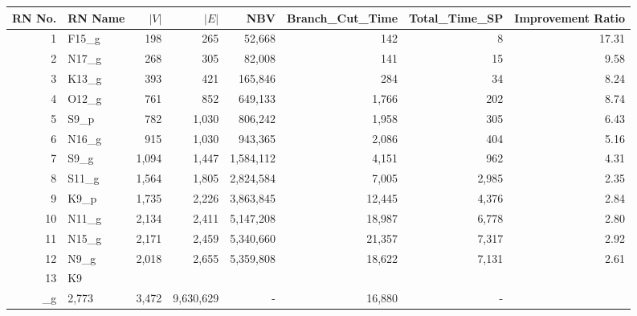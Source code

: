 \begin{tabular}{rlrrrrrr}
\toprule
RN No. & RN Name & $|V|$ & $|E|$ & NBV & Branch_Cut_Time & Total_Time_SP & Improvement Ratio \\
\midrule
1 & F15\_g & 198 & 265 & 52,668 & 142 & 8 & 17.31 \\
2 & N17\_g & 268 & 305 & 82,008 & 141 & 15 & 9.58 \\
3 & K13\_g & 393 & 421 & 165,846 & 284 & 34 & 8.24 \\
4 & O12\_g & 761 & 852 & 649,133 & 1,766 & 202 & 8.74 \\
5 & S9\_p & 782 & 1,030 & 806,242 & 1,958 & 305 & 6.43 \\
6 & N16\_g & 915 & 1,030 & 943,365 & 2,086 & 404 & 5.16 \\
7 & S9\_g & 1,094 & 1,447 & 1,584,112 & 4,151 & 962 & 4.31 \\
8 & S11\_g & 1,564 & 1,805 & 2,824,584 & 7,005 & 2,985 & 2.35 \\
9 & K9\_p & 1,735 & 2,226 & 3,863,845 & 12,445 & 4,376 & 2.84 \\
10 & N11\_g & 2,134 & 2,411 & 5,147,208 & 18,987 & 6,778 & 2.80 \\
11 & N15\_g & 2,171 & 2,459 & 5,340,660 & 21,357 & 7,317 & 2.92 \\
12 & N9\_g & 2,018 & 2,655 & 5,359,808 & 18,622 & 7,131 & 2.61 \\
13 & K9\\_g & 2,773 & 3,472 & 9,630,629 & - & 16,880 & - \\
\bottomrule
\end{tabular}

